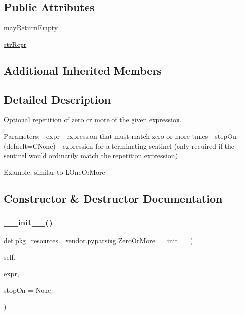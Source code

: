 \subsection*{Public Attributes}
\begin{DoxyCompactItemize}
\item 
\hyperlink{classpkg__resources_1_1__vendor_1_1pyparsing_1_1ZeroOrMore_a813de8236ddd545b42384e7b9532859a}{may\+Return\+Empty}
\item 
\hyperlink{classpkg__resources_1_1__vendor_1_1pyparsing_1_1ZeroOrMore_aa244b0240baa581345171d60304cf4f5}{str\+Repr}
\end{DoxyCompactItemize}
\subsection*{Additional Inherited Members}


\subsection{Detailed Description}
\begin{DoxyVerb}Optional repetition of zero or more of the given expression.

Parameters:
 - expr - expression that must match zero or more times
 - stopOn - (default=C{None}) - expression for a terminating sentinel
      (only required if the sentinel would ordinarily match the repetition 
      expression)          

Example: similar to L{OneOrMore}
\end{DoxyVerb}
 

\subsection{Constructor \& Destructor Documentation}
\mbox{\label{classpkg__resources_1_1__vendor_1_1pyparsing_1_1ZeroOrMore_a07a9f74ce8d589b4f84b37c4b3ae2c41}} 
\subsubsection{\texorpdfstring{\+\_\+\+\_\+init\+\_\+\+\_\+()}{\_\_init\_\_()}}
{\footnotesize\ttfamily def pkg\+\_\+resources.\+\_\+vendor.\+pyparsing.\+Zero\+Or\+More.\+\_\+\+\_\+init\+\_\+\+\_\+ (\begin{DoxyParamCaption}\item[{}]{self,  }\item[{}]{expr,  }\item[{}]{stop\+On = {\ttfamily None} }\end{DoxyParamCaption})}




